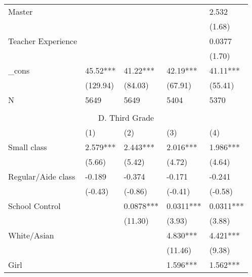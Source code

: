 \documentclass{article}
\begin{document}
\begin{table}[htbp]
\begin{tabular}{lrllrr}
    \multicolumn{2}{l}{Master} &       &       & \multicolumn{1}{l}{} & \multicolumn{1}{l}{2.532} \\
          &       &       &       & \multicolumn{1}{l}{} & \multicolumn{1}{l}{(1.68)} \\
    \multicolumn{2}{l}{Teacher Experience} &       &       & \multicolumn{1}{l}{} & \multicolumn{1}{l}{0.0377} \\
          &       &       &       & \multicolumn{1}{l}{} & \multicolumn{1}{l}{(1.70)} \\
    \multicolumn{2}{l}{\_cons} & 45.52*** & 41.22*** & \multicolumn{1}{l}{42.19***} & \multicolumn{1}{l}{41.11***} \\
          &       & (129.94) & (84.03) & \multicolumn{1}{l}{(67.91)} & \multicolumn{1}{l}{(55.41)} \\
    \multicolumn{2}{l}{N} & 5649  & 5649  & \multicolumn{1}{l}{5404} & \multicolumn{1}{l}{5370} \\
          &       &       &       &       &  \\
    \midrule
    \multicolumn{6}{c}{D. Third Grade} \\
    \midrule
          &       & (1)   & (2)   & \multicolumn{1}{l}{(3)} & \multicolumn{1}{l}{(4)} \\
    \multicolumn{2}{l}{Small class} & 2.579*** & 2.443*** & \multicolumn{1}{l}{2.016***} & \multicolumn{1}{l}{1.986***} \\
          &       & (5.66) & (5.42) & \multicolumn{1}{l}{(4.72)} & \multicolumn{1}{l}{(4.64)} \\
    \multicolumn{2}{l}{Regular/Aide class} & -0.189 & -0.374 & \multicolumn{1}{l}{-0.171} & \multicolumn{1}{l}{-0.241} \\
          &       & (-0.43) & (-0.86) & \multicolumn{1}{l}{(-0.41)} & \multicolumn{1}{l}{(-0.58)} \\
    \multicolumn{2}{l}{School Control} &       & 0.0878*** & \multicolumn{1}{l}{0.0311***} & \multicolumn{1}{l}{0.0311***} \\
          &       &       & (11.30) & \multicolumn{1}{l}{(3.93)} & \multicolumn{1}{l}{(3.88)} \\
    \multicolumn{2}{l}{White/Asian} &       &       & \multicolumn{1}{l}{4.830***} & \multicolumn{1}{l}{4.421***} \\
          &       &       &       & \multicolumn{1}{l}{(11.46)} & \multicolumn{1}{l}{(9.38)} \\
    \multicolumn{2}{l}{Girl} &       &       & \multicolumn{1}{l}{1.596***} & \multicolumn{1}{l}{1.562***} \\

\end{tabular}
\end{table}
\end{document}
